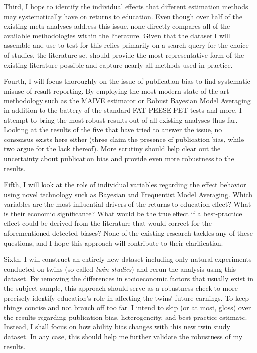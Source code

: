 Third, I hope to identify the individual effects that different estimation methods may systematically have on returns to education. Even though over half of the existing meta-analyses address this issue, none directly compares all of the available methodologies within the literature. Given that the dataset I will assemble and use to test for this relies primarily on a search query for the choice of studies, the literature set should provide the most representative form of the existing literature possible and capture nearly all methods used in practice.

Fourth, I will focus thoroughly on the issue of publication bias to find systematic misuse of result reporting. By employing the most modern state-of-the-art methodology such as the MAIVE estimator \citep{irsova2023maive} or Robust Bayesian Model Averaging \citep{maier2022robust} in addition to the battery of the standard FAT-PEESE-PET tests and more, I attempt to bring the most robust results out of all existing analyses thus far. Looking at the results of the five that have tried to answer the issue, no consensus exists here either (three claim the presence of publication bias, while two argue for the lack thereof). More scrutiny should help clear out the uncertainty about publication bias and provide even more robustness to the results.

Fifth, I will look at the role of individual variables regarding the effect behavior using novel technology such as Bayesian and Frequentist Model Averaging. Which variables are the most influential drivers of the returns to education effect? What is their economic significance? What would be the true effect if a best-practice effect could be derived from the literature that would correct for the aforementioned detected biases? None of the existing research tackles any of these questions, and I hope this approach will contribute to their clarification.

Sixth, I will construct an entirely new dataset including only natural experiments conducted on twins (so-called \textit{twin studies}) and rerun the analysis using this dataset. By removing the differences in socioeconomic factors that usually exist in the subject sample, this approach should serve as a robustness check to more precisely identify education's role in affecting the twins' future earnings.  To keep things concise and not branch off too far, I intend to skip (or at most, gloss) over the results regarding publication bias, heterogeneity, and best-practice estimate. Instead, I shall focus on how ability bias changes with this new twin study dataset. In any case, this should help me further validate the robustness of my results.

